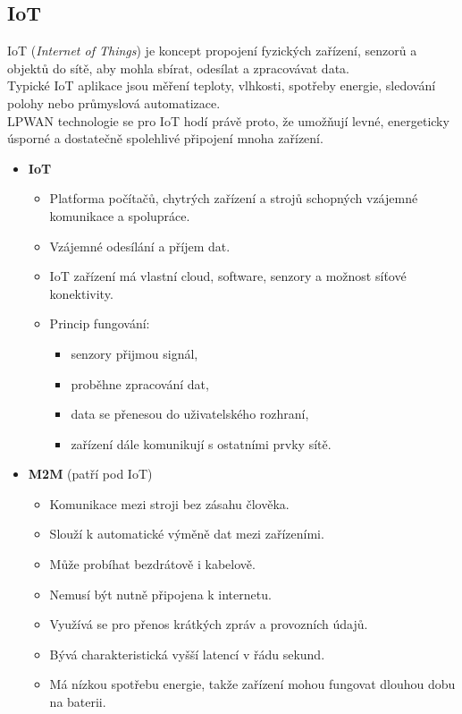 \subsection{IoT}
IoT (\textit{Internet of Things}) je koncept propojení fyzických zařízení, senzorů a objektů do sítě, aby mohla sbírat, odesílat a zpracovávat data.\\
Typické IoT aplikace jsou měření teploty, vlhkosti, spotřeby energie, sledování polohy nebo průmyslová automatizace.\\
LPWAN technologie se pro IoT hodí právě proto, že umožňují levné, energeticky úsporné a dostatečně spolehlivé připojení mnoha zařízení.
\begin{itemize}
	\item \textbf{IoT}
	\begin{itemize}
		\item Platforma počítačů, chytrých zařízení a strojů schopných vzájemné komunikace a spolupráce.
		\item Vzájemné odesílání a příjem dat.
		\item IoT zařízení má vlastní cloud, software, senzory a možnost síťové konektivity.
		\item Princip fungování:
		\begin{itemize}
			\item senzory přijmou signál,
			\item proběhne zpracování dat,
			\item data se přenesou do uživatelského rozhraní,
			\item zařízení dále komunikují s ostatními prvky sítě.
		\end{itemize}
	\end{itemize}
	
	\item \textbf{M2M} (patří pod IoT)
	\begin{itemize}
		\item Komunikace mezi stroji bez zásahu člověka.
		\item Slouží k automatické výměně dat mezi zařízeními.
		\item Může probíhat bezdrátově i kabelově.
		\item Nemusí být nutně připojena k internetu.
		\item Využívá se pro přenos krátkých zpráv a provozních údajů.
		\item Bývá charakteristická vyšší latencí v řádu sekund.
		\item Má nízkou spotřebu energie, takže zařízení mohou fungovat dlouhou dobu na baterii.
	\end{itemize}
\end{itemize}

